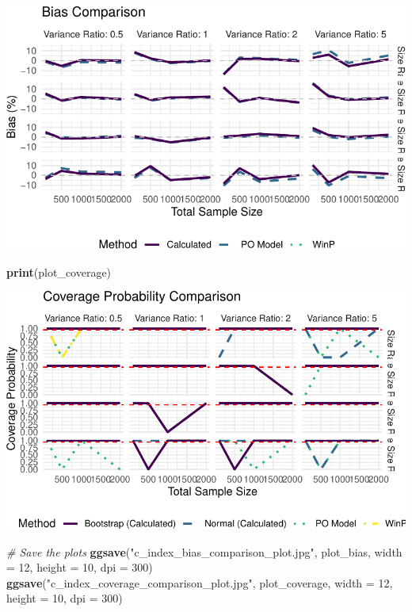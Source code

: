 \documentclass[
  letterpaper,
  DIV=11,
  numbers=noendperiod]{scrartcl}
\newenvironment{Shaded}{\begin{snugshade}}{\end{snugshade}}
\newcommand{\AttributeTok}[1]{\textcolor[rgb]{0.13,0.29,0.53}{#1}}
\newcommand{\CommentTok}[1]{\textcolor[rgb]{0.56,0.35,0.01}{\textit{#1}}}
\newcommand{\DecValTok}[1]{\textcolor[rgb]{0.00,0.00,0.81}{#1}}
\newcommand{\FunctionTok}[1]{\textcolor[rgb]{0.13,0.29,0.53}{\textbf{#1}}}
\newcommand{\NormalTok}[1]{#1}
\newcommand{\StringTok}[1]{\textcolor[rgb]{0.31,0.60,0.02}{#1}}
\begin{document}
\includegraphics{po-model-sim-Quarto_files/figure-pdf/create-plots-1.pdf}

\begin{Shaded}
\begin{Highlighting}[]
\FunctionTok{print}\NormalTok{(plot\_coverage)}
\end{Highlighting}
\end{Shaded}

\includegraphics{po-model-sim-Quarto_files/figure-pdf/create-plots-2.pdf}

\begin{Shaded}
\begin{Highlighting}[]
\CommentTok{\# Save the plots}
\FunctionTok{ggsave}\NormalTok{(}\StringTok{"c\_index\_bias\_comparison\_plot.jpg"}\NormalTok{, plot\_bias, }\AttributeTok{width =} \DecValTok{12}\NormalTok{, }\AttributeTok{height =} \DecValTok{10}\NormalTok{, }\AttributeTok{dpi =} \DecValTok{300}\NormalTok{)}
\FunctionTok{ggsave}\NormalTok{(}\StringTok{"c\_index\_coverage\_comparison\_plot.jpg"}\NormalTok{, plot\_coverage, }\AttributeTok{width =} \DecValTok{12}\NormalTok{, }\AttributeTok{height =} \DecValTok{10}\NormalTok{, }\AttributeTok{dpi =} \DecValTok{300}\NormalTok{)}
\end{Highlighting}
\end{Shaded}
\end{document}
